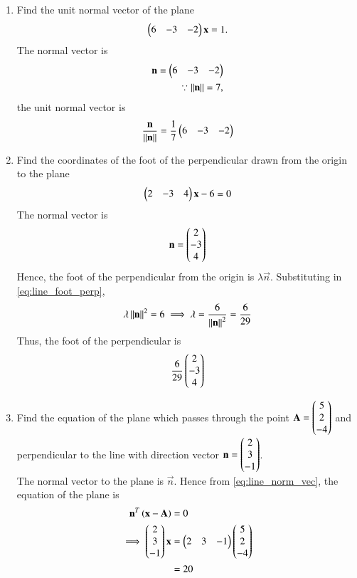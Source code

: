 \begin{enumerate}[label=\arabic*.,ref=\thesubsection.\theenumi]
\item Find the unit normal vector of the plane 
\begin{align}
\begin{pmatrix}6 & -3 & -2\end{pmatrix}\mathbf{x}  = 1.
\end{align}
%
\solution The normal vector is 
%
\begin{align}
\mathbf{n} = \begin{pmatrix}6 & -3 & -2\end{pmatrix}
\\
\because \left\lVert\mathbf{n}\right\rVert = 7,
\end{align}
%
the unit normal vector is 
%
\begin{align}
\frac{\mathbf{n}}{\left\lVert\mathbf{n}\right\rVert} = \frac{1}{7}\begin{pmatrix}6 & -3 & -2\end{pmatrix}
\end{align}
%
\item Find the coordinates of the foot of the perpendicular drawn from the origin to the plane 
\begin{align}
\label{eq:line_foot_perp}
\begin{pmatrix}2 & -3 & 4\end{pmatrix}\mathbf{x}-6  = 0
\end{align}
%
\solution The normal vector is 
%
\begin{align}
\mathbf{n}=\begin{pmatrix}2 \\ -3 \\ 4\end{pmatrix}
\end{align}
%
Hence, the foot of the perpendicular from the origin is $\lambda \vec{n}$.  Substituting in \eqref{eq:line_foot_perp},
\begin{align}
\lambda \left\lVert\mathbf{n}\right\rVert^2 = 6  \implies \lambda = \frac{6}{\left\lVert\mathbf{n}\right\rVert^2} = \frac{6}{29}
\end{align}
%
Thus, the foot of the perpendicular is
%
\begin{align}
\frac{6}{29}\begin{pmatrix}2 \\ -3 \\ 4\end{pmatrix}
\end{align}
%
\item Find the equation of the plane which passes through the point $\mathbf{A}=\begin{pmatrix}5\\2\\-4\end{pmatrix}$ and perpendicular to the line with direction vector $\mathbf{n}=\begin{pmatrix}2\\3\\-1\end{pmatrix}$.
%
\\
\solution  The normal vector to the plane is $\vec{n}$. Hence from \eqref{eq:line_norm_vec}, the equation of the plane is 
%
\begin{align}
\mathbf{n}^T\left(\mathbf{x}-\mathbf{A}\right) &= 0
\\
\implies \begin{pmatrix}2\\3\\-1\end{pmatrix}\mathbf{x} &=\begin{pmatrix}2&3&-1\end{pmatrix}\begin{pmatrix}5\\2\\-4\end{pmatrix}
\\
&=20
\end{align}
%


\end{enumerate}
